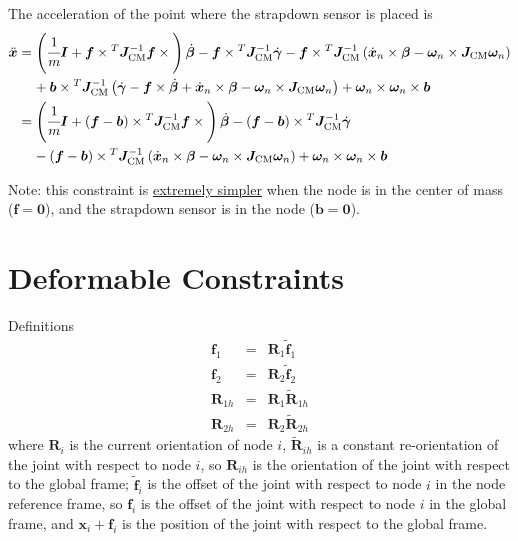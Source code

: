\documentclass[10pt,dvips,fleqn,subeqn]{report}
\newcommand{\T}[1]{\bm{#1}}
\newcommand{\TT}[1]{\bm{#1}}
\begin{document}
The acceleration of the point where the strapdown sensor is placed is
\begin{align}
	\ddot{\T{x}}
	&=
	\plbr{
		\cfrac{1}{m} \TT{I}
		+
		\T{f} \times{}^T \TT{J}_\text{CM}^{-1} \T{f}\times{}
	} \dot{\T{\beta}}
	-
	\T{f}\times{}^T \TT{J}_\text{CM}^{-1} \dot{\T{\gamma}}
	-
	\T{f}\times{}^T \TT{J}_\text{CM}^{-1} \plbr{
		\dot{\T{x}}_n \times \T{\beta}
		-
		\T{\omega}_n \times \TT{J}_\text{CM} \T{\omega}_n
	}
	\nonumber \\ &\mbox{\hphantom{= }}
	+ \T{b}\times{}^T \TT{J}_\text{CM}^{-1} \plbr{
		\dot{\T{\gamma}}
		-
		\T{f}\times\dot{\T{\beta}}
		+
		\dot{\T{x}}_n \times \T{\beta}
		-
		\T{\omega}_n \times \TT{J}_\text{CM} \T{\omega}_n
	}
	+
	\T{\omega}_n \times \T{\omega}_n \times \T{b}
	\nonumber \\
	&=
	\plbr{
		\cfrac{1}{m} \TT{I}
		+
		\plbr{\T{f} - \T{b}}\times{}^T \TT{J}_\text{CM}^{-1} \T{f}\times{}
	} \dot{\T{\beta}}
	-
	\plbr{\T{f} - \T{b}}\times{}^T \TT{J}_\text{CM}^{-1} \dot{\T{\gamma}}
	\nonumber \\ &\mbox{\hphantom{= }}
	-
	\plbr{\T{f} - \T{b}}\times{}^T \TT{J}_\text{CM}^{-1} \plbr{
		\dot{\T{x}}_n \times \T{\beta}
		-
		\T{\omega}_n \times \TT{J}_\text{CM} \T{\omega}_n
	}
	+
	\T{\omega}_n \times \T{\omega}_n \times \T{b}
\end{align}

Note: this constraint is \underline{extremely simpler}
when the node is in the center of mass ($\T{f} = \T{0}$),
and the strapdown sensor is in the node ($\T{b} = \T{0}$).







\section{Deformable Constraints}
Definitions
\begin{eqnarray*}
	\T{f}_1 & = & \T{R}_1 \tilde{\T{f}}_1 \\
	\T{f}_2 & = & \T{R}_2 \tilde{\T{f}}_2 \\
	\T{R}_{1h} & = & \T{R}_1 \tilde{\T{R}}_{1h} \\
	\T{R}_{2h} & = & \T{R}_2 \tilde{\T{R}}_{2h}
\end{eqnarray*}
where $\T{R}_i$ is the current orientation of node $i$, 
$\tilde{\T{R}}_{ih}$ is a constant re-orientation of the joint
with respect to node $i$, so $\T{R}_{ih}$ is the orientation
of the joint with respect to the global frame;
$\tilde{\T{f}}_i$ is the offset of the joint with respect to
node $i$ in the node reference frame, so $\T{f}_i$ is the offset 
of the joint with respect to node $i$ in the global frame, and
$\T{x}_i+\T{f}_i$ is the position of the joint with respect 
to the global frame.
\end{document}
